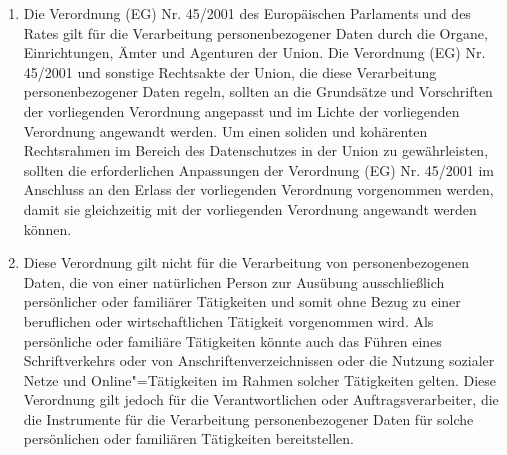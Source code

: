 \begin{enumerate}
   \item Die Verordnung (EG) Nr. 45/2001 des Europäischen Parlaments und des Rates gilt für die Verarbeitung personenbezogener Daten durch die Organe,
    Einrichtungen, Ämter und Agenturen der Union. Die Verordnung (EG) Nr. 45/2001 und sonstige Rechtsakte der Union,
    die diese Verarbeitung personenbezogener Daten regeln, sollten an die Grundsätze und Vorschriften der vorliegenden
    Verordnung angepasst und im Lichte der vorliegenden Verordnung angewandt werden. Um einen soliden und kohärenten
    Rechtsrahmen im Bereich des Datenschutzes in der Union zu gewährleisten, sollten die erforderlichen Anpassungen der
    Verordnung (EG) Nr. 45/2001 im Anschluss an den Erlass der vorliegenden Verordnung vorgenommen werden, damit sie
    gleichzeitig mit der vorliegenden Verordnung angewandt werden können.%
   \label{eg:17}
   

   \item Diese Verordnung gilt nicht für die Verarbeitung von personenbezogenen Daten, die von einer natürlichen Person
    zur Ausübung ausschließlich persönlicher oder familiärer Tätigkeiten und somit ohne Bezug zu einer beruflichen oder
    wirtschaftlichen Tätigkeit vorgenommen wird. Als persönliche oder familiäre Tätigkeiten könnte auch das Führen
    eines Schriftverkehrs oder von Anschriftenverzeichnissen oder die Nutzung sozialer Netze und Online"=Tätigkeiten im
    Rahmen solcher Tätigkeiten gelten. Diese Verordnung gilt jedoch für die Verantwortlichen oder Auftragsverarbeiter,
    die die Instrumente für die Verarbeitung personenbezogener Daten für solche persönlichen oder familiären
    Tätigkeiten bereitstellen.%
   \label{eg:18}
   


\end{enumerate}
